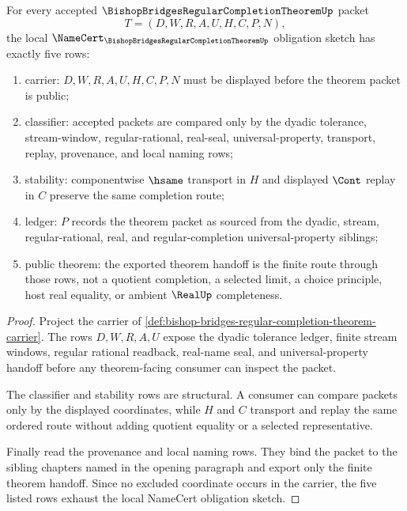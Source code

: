 \begin{theorem}
\label{thm:bishop-bridges-regular-completion-theorem-namecert-obligations}
For every accepted $\BishopBridgesRegularCompletionTheoremUp$ packet
$$
T=(D,W,R,A,U,H,C,P,N),
$$
the local $\NameCert_{\BishopBridgesRegularCompletionTheoremUp}$ obligation sketch has exactly five rows:
\begin{enumerate}
\item carrier: $D,W,R,A,U,H,C,P,N$ must be displayed before the theorem packet is public;
\item classifier: accepted packets are compared only by the dyadic tolerance, stream-window, regular-rational, real-seal, universal-property, transport, replay, provenance, and local naming rows;
\item stability: componentwise $\hsame$ transport in $H$ and displayed $\Cont$ replay in $C$ preserve the same completion route;
\item ledger: $P$ records the theorem packet as sourced from the dyadic, stream, regular-rational, real, and regular-completion universal-property siblings;
\item public theorem: the exported theorem handoff is the finite route through those rows, not a quotient completion, a selected limit, a choice principle, host real equality, or ambient $\RealUp$ completeness.
\end{enumerate}
\end{theorem}
\begin{proof}
Project the carrier of \autoref{def:bishop-bridges-regular-completion-theorem-carrier}. The rows $D,W,R,A,U$ expose the dyadic tolerance ledger, finite stream windows, regular rational readback, real-name seal, and universal-property handoff before any theorem-facing consumer can inspect the packet.

The classifier and stability rows are structural. A consumer can compare packets only by the displayed coordinates, while $H$ and $C$ transport and replay the same ordered route without adding quotient equality or a selected representative.

Finally read the provenance and local naming rows. They bind the packet to the sibling chapters named in the opening paragraph and export only the finite theorem handoff. Since no excluded coordinate occurs in the carrier, the five listed rows exhaust the local NameCert obligation sketch.
\end{proof}

